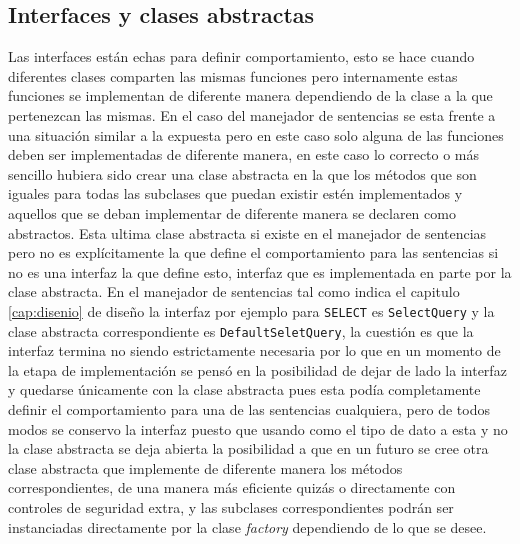 \subsection{Interfaces y clases abstractas}
%
Las interfaces están echas para definir comportamiento, esto se hace cuando diferentes clases comparten las mismas funciones pero internamente estas funciones se implementan de diferente manera dependiendo de la clase a la que pertenezcan las mismas. En el caso del manejador de sentencias se esta frente a una situación similar a la expuesta pero en este caso solo alguna de las funciones deben ser implementadas de diferente manera, en este caso lo correcto o más sencillo hubiera sido crear una clase abstracta en la que los métodos que son iguales para todas las subclases que puedan existir estén implementados y aquellos que se deban implementar de diferente manera se declaren como abstractos. Esta ultima clase abstracta si existe en el manejador de sentencias pero no es explícitamente la que define el comportamiento para las sentencias si no es una interfaz la que define esto, interfaz que es implementada en parte por la clase abstracta. En el manejador de sentencias tal como indica el capitulo \ref{cap:disenio} de diseño la interfaz por ejemplo para \verb=SELECT= es \verb=SelectQuery= y la clase abstracta correspondiente es \verb=DefaultSeletQuery=, la cuestión es que la interfaz termina no siendo estrictamente necesaria por lo que en un momento de la etapa de implementación se pensó en la posibilidad de dejar de lado la interfaz y quedarse únicamente con la clase abstracta pues esta podía completamente definir el comportamiento para una de las sentencias cualquiera, pero de todos modos se conservo la interfaz puesto que usando como el tipo de dato a esta y no la clase abstracta se deja abierta la posibilidad a que en un futuro se cree otra clase abstracta que implemente de diferente manera los métodos correspondientes, de una manera más eficiente quizás o directamente con controles de seguridad extra, y las subclases correspondientes podrán ser instanciadas directamente por la clase \textit{factory} dependiendo de lo que se desee. 
%
